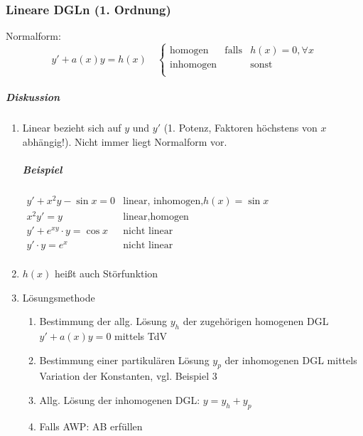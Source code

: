 \documentclass[a4paper]{scrartcl}
\begin{document}
\subsubsection{Lineare DGLn (1. Ordnung)}
Normalform: 
\[y' + a(x)y = h(x) \quad \left \{ \begin{array}{lcr} \text{homogen} & \text{falls} & h(x) = 0, \forall x \\ \text{inhomogen} && \text{sonst}\\ \end{array} \right. \]

\subparagraph{Diskussion}
\begin{enumerate}
\item Linear bezieht sich auf $y$ und $y'$ (1. Potenz, Faktoren höchstens von $x$ abhängig!). Nicht immer liegt Normalform vor.

\subparagraph{Beispiel}
$\begin{array}{lr}
y' + x^2 y - \sin{x} = 0 & \text{linear, inhomogen,} h(x) = \sin{x}\\
x^2 y'=y & \text{linear,homogen}\\
y' + e^{xy} \cdot y = \cos{x} & \text{nicht linear} \\
y' \cdot y = e^x & \text{nicht linear}\\
\end{array}$
\item $h(x)$ heißt auch Störfunktion
\item Lösungsmethode
\begin{enumerate}
\item Bestimmung der allg. Lösung $y_h$ der zugehörigen homogenen DGL $y' + a(x) y = 0$ mittels TdV
\item Bestimmung einer partikulären Lösung $y_p$ der inhomogenen DGL mittels Variation der Konstanten, vgl. Beispiel 3
\item Allg. Lösung der inhomogenen DGL: $y= y_h + y_p$
\item Falls AWP: AB erfüllen
\end{enumerate}
\end{enumerate}
\end{document}
